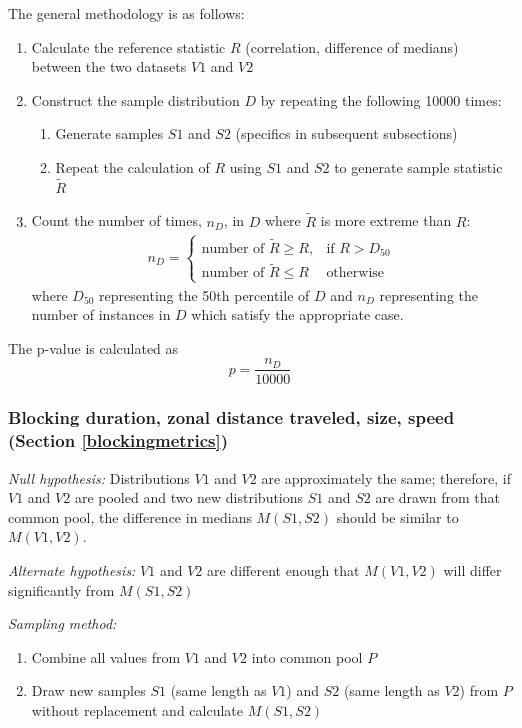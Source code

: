 \documentclass[smallextended]{svjour3}       %
\numberwithin{equation}{section}
\begin{document}
\begin{appendices}
The general methodology is as follows:
\begin{enumerate}
    \item Calculate the reference statistic $R$ (correlation, difference of medians) between the two datasets $V1$ and $V2$
    \item Construct the sample distribution $D$ by repeating the following 10000 times:
    \begin{enumerate}
        \item Generate samples $S1$ and $S2$ (specifics in subsequent subsections)
        \item Repeat the calculation of $R$ using $S1$ and $S2$ to generate sample statistic $\widetilde{R}$
    \end{enumerate}
    \item Count the number of times, $n_D$, in $D$ where $\widetilde{R}$ is more extreme than $R$: \begin{eqnarray}
n_D =  
\begin{cases}
    \text{number of } \widetilde{R}\geq R,& \text{if } R>D_{50}\\
     \text{number of }\widetilde{R}\leq R             & \text{otherwise}
\end{cases}
\end{eqnarray}
where $D_{50}$ representing the 50th percentile of $D$ and $n_D$ representing the number of instances in $D$ which satisfy the appropriate case. 
\end{enumerate}

The p-value is calculated as \begin{equation}
    p=\frac{n_D}{10000}
\end{equation}

\subsubsection{Blocking duration, zonal distance traveled, size, speed (Section \ref{blockingmetrics})}
\textit{Null hypothesis:} Distributions $V1$ and $V2$ are approximately the same; therefore, if $V1$ and $V2$ are pooled and two new distributions $S1$ and $S2$ are drawn from that common pool, the difference in medians $M(S1,S2)$ should be similar to $M(V1,V2)$.

\noindent\textit{Alternate hypothesis:} $V1$ and $V2$ are different enough that $M(V1,V2)$ will differ significantly from $M(S1,S2)$

\noindent\textit{Sampling method:}
\begin{enumerate}
     \item Combine all values from $V1$ and $V2$ into common pool $P$
    \item Draw new samples $S1$ (same length as $V1$) and $S2$ (same length as $V2$) from $P$ without replacement and calculate $M(S1,S2)$
\end{enumerate}



\end{appendices}
\end{document}
